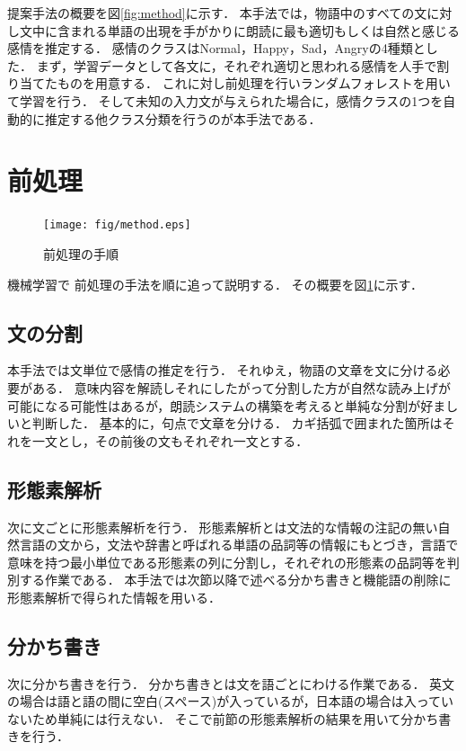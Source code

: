 提案手法の概要を図\ref{fig:method}に示す．
本手法では，物語中のすべての文に対し文中に含まれる単語の出現を手がかりに朗読に最も適切もしくは自然と感じる感情を推定する．
感情のクラスはNormal，Happy，Sad，Angryの4種類とした．
まず，学習データとして各文に，それぞれ適切と思われる感情を人手で割り当てたものを用意する．
これに対し前処理を行いランダムフォレストを用いて学習を行う．
そして未知の入力文が与えられた場合に，感情クラスの1つを自動的に推定する他クラス分類を行うのが本手法である．

\section{前処理}

\begin{figure}[ht]
  \begin{center}
    \texttt{[image: fig/method.eps]}
    \caption{前処理の手順}
    \label{fig:pre}
  \end{center}
\end{figure}

機械学習で
前処理の手法を順に追って説明する．
その概要を図\ref{fig:pre}に示す．


\subsection{文の分割}\label{subsec:divide}
本手法では文単位で感情の推定を行う．
それゆえ，物語の文章を文に分ける必要がある．
意味内容を解読しそれにしたがって分割した方が自然な読み上げが可能になる可能性はあるが，朗読システムの構築を考えると単純な分割が好ましいと判断した．
基本的に，句点で文章を分ける．
カギ括弧で囲まれた箇所はそれを一文とし，その前後の文もそれぞれ一文とする．

\subsection{形態素解析}
次に文ごとに形態素解析を行う．
形態素解析とは文法的な情報の注記の無い自然言語の文から，文法や辞書と呼ばれる単語の品詞等の情報にもとづき，言語で意味を持つ最小単位である形態素の列に分割し，それぞれの形態素の品詞等を判別する作業である．
本手法では次節以降で述べる分かち書きと機能語の削除に形態素解析で得られた情報を用いる．

\subsection{分かち書き}
次に分かち書きを行う．
分かち書きとは文を語ごとにわける作業である．
英文の場合は語と語の間に空白(スペース)が入っているが，日本語の場合は入っていないため単純には行えない．
そこで前節の形態素解析の結果を用いて分かち書きを行う．

